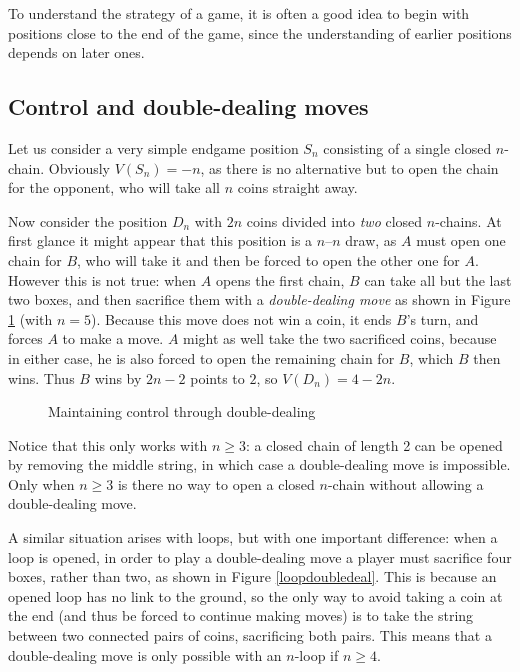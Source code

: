 \documentclass[a4paper,twocolumn]{article}
\begin{document}
To understand the strategy of a game, it is often a good idea to begin
with positions close to the end of the game, since the understanding
of earlier positions depends on later ones.

\subsection{Control and double-dealing moves}

Let us consider a very simple endgame position $S_n$ consisting of a
single closed $n$-chain. Obviously $V(S_n)=-n$, as there is no
alternative but to open the chain for the opponent, who will take all
$n$ coins straight away.

Now consider the position $D_n$ with $2n$ coins divided into
\emph{two} closed $n$-chains. At first glance it might appear that
this position is a $n$--$n$ draw, as $A$ must open one chain for $B$,
who will take it and then be forced to open the other one for
$A$. However this is not true: when $A$ opens the first chain, $B$ can
take all but the last two boxes, and then sacrifice them with a
\emph{double-dealing move} as shown in Figure \ref{dddemo} (with
$n=5$). Because this move does not win a coin, it ends $B$'s turn, and
forces $A$ to make a move. $A$ might as well take the two sacrificed
coins, because in either case, he is also forced to open the remaining
chain for $B$, which $B$ then wins. Thus $B$ wins by $2n - 2$ points
to $2$, so $V(D_n) = 4-2n$.

\begin{figure}
  \centering
  \def\svgscale{0.7}
  
  \caption{Maintaining control through double-dealing}
  \label{dddemo}
\end{figure}

Notice that this only works with $n \ge 3$: a closed chain of length 2
can be opened by removing the middle string, in which case a
double-dealing move is impossible. Only when $n \ge 3$ is there no way
to open a closed $n$-chain without allowing a double-dealing move.

A similar situation arises with loops, but with one important
difference: when a loop is opened, in order to play a double-dealing
move a player must sacrifice four boxes, rather than two, as shown in
Figure \ref{loopdoubledeal}. This is because an opened loop has no
link to the ground, so the only way to avoid taking a coin at the end
(and thus be forced to continue making moves) is to take the string
between two connected pairs of coins, sacrificing both pairs. This
means that a double-dealing move is only possible with an $n$-loop if
$n \ge 4$.
\end{document}

